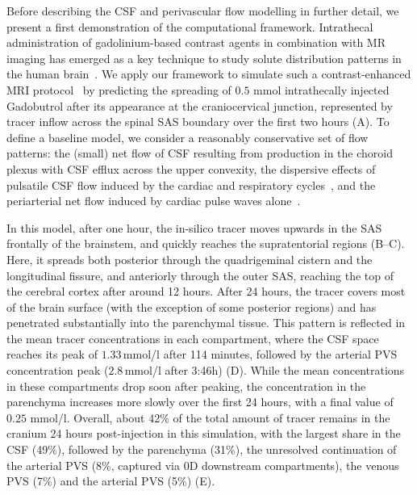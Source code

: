 \documentclass[fleqn,10pt]{wlscirep}
\begin{document}
Before describing the CSF and perivascular flow modelling in further
detail, we present a first demonstration of the computational
framework. Intrathecal administration of gadolinium-based contrast
agents in combination with MR imaging has emerged as a key technique
to study solute distribution patterns in the human
brain~\cite{ringstad2017glymphatic, ringstad2018brain,
  eide2024functional, van2024human, kipnis2025resolving}. We apply our
framework to simulate such a contrast-enhanced MRI
protocol~\cite{ringstad2018brain} by predicting the spreading of $0.5$
mmol intrathecally injected Gadobutrol after its appearance at the
craniocervical junction, represented by tracer inflow across the
spinal SAS boundary over the first two hours
(A). To define a baseline model, we consider a
reasonably conservative set of flow patterns: the (small) net flow of
CSF resulting from production in the choroid plexus with CSF efflux across the upper convexity\cite{hornkjol2022csf}, the dispersive effects of pulsatile
CSF flow induced by the cardiac and respiratory
cycles~\cite{sweetman2011cerebrospinal, vinje2019respiratory}, and the
periarterial net flow induced by cardiac pulse waves
alone~\cite{mestre2018flow, gjerde2023directional}.

In this model, after one hour, the in-silico tracer moves upwards in
the SAS frontally of the brainstem, and quickly reaches the
supratentorial regions (B--C). Here, it spreads
both posterior through the quadrigeminal cistern and the longitudinal
fissure, and anteriorly through the outer SAS, reaching the top of the
cerebral cortex after around 12 hours. After 24 hours, the tracer
covers most of the brain surface (with the exception of some posterior
regions) and has penetrated substantially into the parenchymal
tissue. This pattern is reflected in the mean tracer concentrations in
each compartment, where the CSF space reaches its peak of
$1.33\,$mmol/l after 114 minutes, followed by the arterial PVS
concentration peak ($2.8\,$mmol/l after 3:46h)
(D). While the mean concentrations in
these compartments drop soon after peaking, the concentration in the
parenchyma increases more slowly over the first 24 hours, with a final
value of $0.25$ mmol/l. Overall, about 42\% of the total amount of
tracer remains in the cranium 24 hours post-injection in this
simulation, with the largest share in the CSF (49\%), followed by the
parenchyma (31\%), the unresolved continuation of the arterial PVS (8\%, captured via 0D downstream compartments), the venous PVS (7\%) and the arterial PVS (5\%)
(E).
\end{document}
